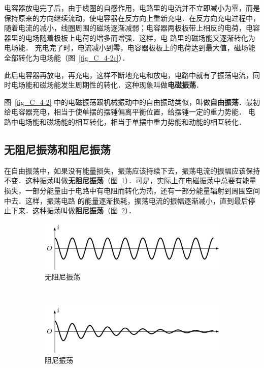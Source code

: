 电容器放电完了后，由于线圈的自感作用，电路里的电流并不立即减小为零，而是保持原来的方向继续流动，使电容器在反方向上重新充电．在反方向充电过程中，随着电流的减小，线圈周围的磁场逐渐减弱；电容器两极板带上相反的电荷，电容器里的电场随着极板上电荷的增多而增强．这样，电
路里的磁场能又逐渐转化为电场能．
充电完了时，电流减小到零，电容器极板上的电荷达到最大值，磁场能全部转化为电场能（图~\ref{fig_C_4-2c}）．

此后电容器再放电，再充电，这样不断地充电和放电，电路中就有了振荡电流，同时电场能和磁场能发生周期性的转化．这种现象叫做\textbf{电磁振荡}．

图~\ref{fig_C_4-2} 中的电磁振荡跟机械振动中的自由振动类似，叫做\textbf{自由振荡}．最初给电容器充电，相当于使单摆的摆锤偏离平衡位置，给摆锤一定的重力势能．
电路中电场能和磁场能的相互转化，相当于单摆中重力势能和动能的相互转化．

\subsection{无阻尼振荡和阻尼振荡}

在自由振荡中，如果没有能量损失，振荡应该持续下去，振荡电流的振幅应该保持不变．这种振荡叫做\textbf{无阻尼振荡}（图~\ref{fig_C_4-3a}）．可是，实际上在电磁振荡中总要有能量损失，一部分能量由于电路中有电阻而转化为热，还有一部分能量辐射到周围空间中去．这样，振荡电路
的能量逐渐损耗，振荡电流的振幅逐渐减小，直到最后停止下来．这种振荡叫做\textbf{阻尼振荡}（图~\ref{fig_C_4-3b}）．
\begin{figure}[htbp]
    \centering
    \begin{subfigure}{0.8\linewidth}
        \centering
        \includegraphics{fig/C/4-3a.pdf}
        \caption{无阻尼振荡}\label{fig_C_4-3a}
    \end{subfigure}
    \\
    \begin{subfigure}{0.8\linewidth}
        \centering
        \includegraphics{fig/C/4-3b.pdf}
        \caption{阻尼振荡}\label{fig_C_4-3b}
    \end{subfigure}
    \caption{}\label{fig_C_4-3}
\end{figure}

